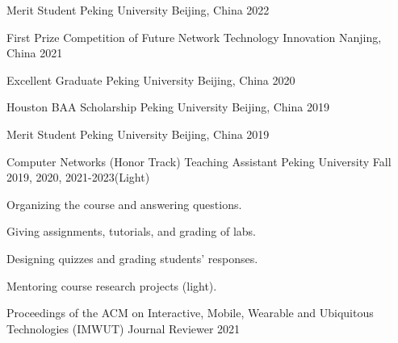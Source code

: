 \documentclass[11pt, a4paper]{awesome-cv}
\begin{document}
\begin{cvhonors}
	
	\cvhonor
	{Merit Student} %
	{Peking University} %
	{Beijing, China} %
	{2022} %
	
	\cvhonor
	{First Prize} %
	{Competition of Future Network Technology Innovation} %
	{Nanjing, China} %
	{2021} %
	
	\cvhonor
	{Excellent Graduate} %
	{Peking University} %
	{Beijing, China} %
	{2020} %
	
	\cvhonor
	{Houston BAA Scholarship} %
	{Peking University} %
	{Beijing, China} %
	{2019} %
	
	\cvhonor
	{Merit Student} %
	{Peking University} %
	{Beijing, China} %
	{2019} %

\end{cvhonors}

\begin{cventries}
	
	\cventry
	{Computer Networks (Honor Track)}
	{Teaching Assistant}
	{Peking University}
	{Fall 2019, 2020, 2021-2023(Light)}
	{
		\begin{cvitems} %
			\item {Organizing the course and answering questions.}
			\item {Giving assignments, tutorials, and grading of labs.}
			\item {Designing quizzes and grading students' responses.}
			\item {Mentoring course research projects (light).}
		\end{cvitems}
	}
	
	\cventry
	{Proceedings of the ACM on Interactive, Mobile, Wearable and Ubiquitous Technologies (IMWUT)} %
	{Journal Reviewer} %
	{} %
	{2021} %
	{}	
	
\end{cventries}

%
%
%
%
%
%
%
%


\end{document}
